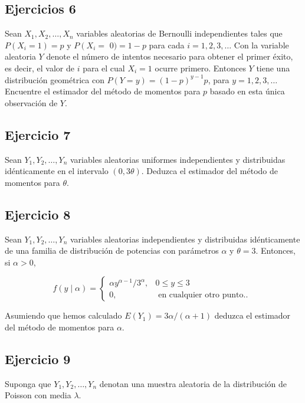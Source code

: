 \documentclass[
]{article}
\begin{document}
\subsection{Ejercicios 6}\label{ejercicios-6}

Sean \(X_{1}, X_{2}, \ldots, X_{n}\) variables aleatorias de Bernoulli independientes tales que \(P\left(X_{i}=1\right)=p\) y \(P\left(X_{i}=\right.\) \(0)=1-p\) para cada \(i=1,2,3, \ldots\) Con la variable aleatoria \(Y\) denote el número de intentos necesario para obtener el primer éxito, es decir, el valor de \(i\) para el cual \(X_{i}=1\) ocurre primero. Entonces \(Y\) tiene una distribución geométrica con \(P(Y=y)=(1-p)^{y-1} p\), para \(y=1,2,3, \ldots\) Encuentre el estimador del método de momentos para \(p\) basado en esta única observación de \(Y\).

\subsection{Ejercicio 7}\label{ejercicio-7-2}

Sean \(Y_{1}, Y_{2}, \ldots, Y_{n}\) variables aleatorias uniformes independientes y distribuidas idénticamente en el intervalo \((0,3 \theta)\). Deduzca el estimador del método de momentos para \(\theta\).

\subsection{Ejercicio 8}\label{ejercicio-8-2}

Sean \(Y_{1}, Y_{2}, \ldots, Y_{n}\) variables aleatorias independientes y distribuidas idénticamente de una familia de distribución de potencias con parámetros \(\alpha\) y \(\theta=3\). Entonces, si \(\alpha>0\),

\[
f(y \mid \alpha)= \begin{cases}\alpha y^{\alpha-1} / 3^{\alpha}, & 0 \leq y \leq 3 \\ 0, & \text { en cualquier otro punto.. }\end{cases}
\]

Asumiendo que hemos calculado \(E\left(Y_{1}\right)=3 \alpha /(\alpha+1)\) deduzca el estimador del método de momentos para \(\alpha\).

\subsection{Ejercicio 9}\label{ejercicio-9-1}

Suponga que \(Y_{1}, Y_{2}, \ldots, Y_{n}\) denotan una muestra aleatoria de la distribución de Poisson con media \(\lambda\).
\end{document}
